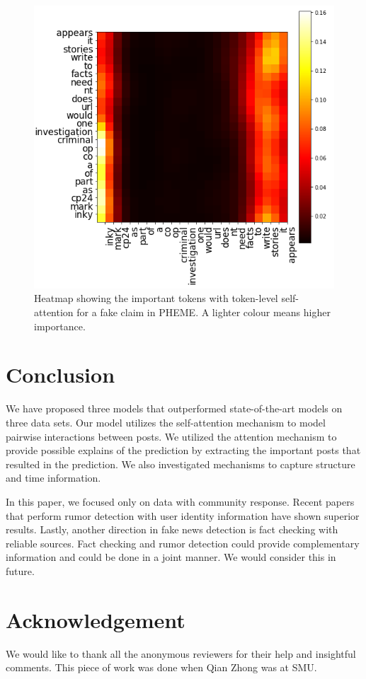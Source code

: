 \documentclass[letterpaper]{article} %
\begin{document}
\begin{figure}[t]
\centering
\includegraphics[width= 0.8 \columnwidth]{word_level_attention_cmyk.png}
\caption{Heatmap showing the important tokens with token-level self-attention for a fake claim in PHEME. A lighter colour means higher importance.}
\label{fig:heatmap}
\end{figure}

\section{Conclusion}

We have proposed three models that outperformed state-of-the-art models on three data sets. Our model utilizes the self-attention mechanism to model pairwise interactions between posts. We utilized the attention mechanism to provide possible explains of the prediction by extracting the important posts that resulted in the prediction. We also investigated mechanisms to capture structure and time information.

In this paper, we focused only on data with community response. Recent papers that perform rumor detection with user identity information have shown superior results.
Lastly, another direction in fake news detection is fact checking with reliable sources. Fact checking and rumor detection could provide complementary information and could be done in a joint manner. We would consider this in future.

\section*{Acknowledgement}
We would like to thank all the anonymous reviewers for their help and insightful comments. This piece of work was done when Qian Zhong was at SMU.
\end{document}

